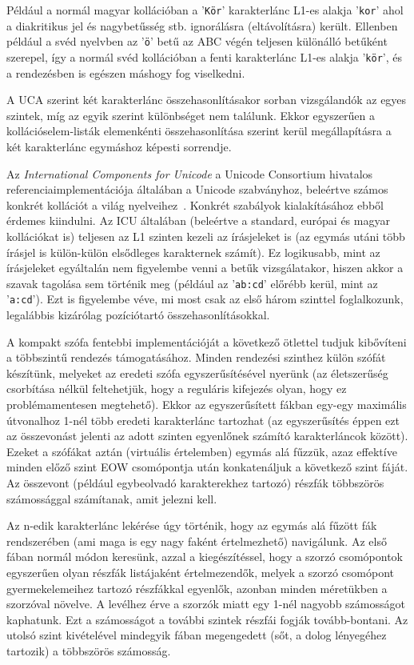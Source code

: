 \documentclass[
    parspace,
    noindent,
    nohyp,
]{elteiktdk}[2023/04/10]
\begin{document}
Például a normál magyar kollációban a '\texttt{Kör}' karakterlánc L1-es alakja '\texttt{kor}'
ahol a diakritikus jel és nagybetűsség stb. ignorálásra (eltávolításra) került.
Ellenben például a svéd nyelvben az '\texttt{ö}' betű az ABC végén
teljesen különálló betűként szerepel,
így a normál svéd kollációban a fenti karakterlánc L1-es alakja '\texttt{kör}',
és a rendezésben is egészen máshogy fog viselkedni.

A UCA szerint két karakterlánc összehasonlításakor sorban vizsgálandók az egyes szintek,
míg az egyik szerint különbséget nem találunk.
Ekkor egyszerűen a kollációselem-listák elemenkénti összehasonlítása szerint
kerül megállapításra a két karakterlánc egymáshoz képesti sorrendje.

Az \textit{International Components for Unicode} a Unicode Consortium hivatalos
referenciaimplementációja általában a Unicode szabványhoz,
beleértve számos konkrét kollációt a világ nyelveihez~\protect\cite{ICU2024}.
Konkrét szabályok kialakításához ebből érdemes kiindulni.
Az ICU általában (beleértve a standard, európai és magyar kollációkat is)
teljesen az L1 szinten kezeli az írásjeleket is
(az egymás utáni több írásjel is külön-külön elsődleges karakternek számít).
Ez logikusabb, mint az írásjeleket egyáltalán nem figyelembe venni a betűk vizsgálatakor,
hiszen akkor a szavak tagolása sem történik meg
(például az '\texttt{ab:cd}' előrébb kerül, mint az '\texttt{a:cd}').
Ezt is figyelembe véve, mi most csak az első három szinttel foglalkozunk,
legalábbis kizárólag pozíciótartó összehasonlításokkal.

A kompakt szófa fentebbi implementációját a következő ötlettel tudjuk kibővíteni
a többszintű rendezés támogatásához.
Minden rendezési szinthez külön szófát készítünk, melyeket az eredeti szófa egyszerűsítésével nyerünk
(az életszerűség csorbítása nélkül feltehetjük,
hogy a reguláris kifejezés olyan, hogy ez problémamentesen megtehető).
Ekkor az egyszerűsített fákban egy-egy maximális útvonalhoz 1-nél több eredeti karakterlánc tartozhat
(az egyszerűsítés éppen ezt az összevonást jelenti
az adott szinten egyenlőnek számító karakterláncok között).
Ezeket a szófákat aztán (virtuális értelemben) egymás alá fűzzük,
azaz effektíve minden előző szint EOW csomópontja után konkatenáljuk a következő szint fáját.
Az összevont (például egybeolvadó karakterekhez tartozó) részfák
többszörös számossággal számítanak, amit jelezni kell.

Az n-edik karakterlánc lekérése úgy történik,
hogy az egymás alá fűzött fák rendszerében (ami maga is egy nagy faként értelmezhető) navigálunk.
Az első fában normál módon keresünk, azzal a kiegészítéssel,
hogy a szorzó csomópontok egyszerűen olyan részfák listájaként értelmezendők,
melyek a szorzó csomópont gyermekelemeihez tartozó részfákkal egyenlők,
azonban minden méretükben a szorzóval növelve.
A levélhez érve a szorzók miatt egy 1-nél nagyobb számosságot kaphatunk.
Ezt a számosságot a további szintek részfái fogják tovább-bontani.
Az utolsó szint kivételével mindegyik fában megengedett (sőt, a dolog lényegéhez tartozik)
a többszörös számosság.
\end{document}
